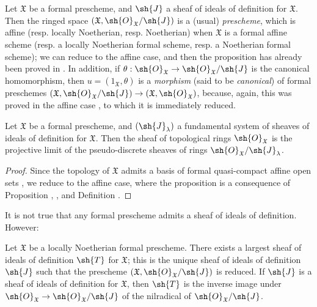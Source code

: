 \begin{env}[10.5.2]
\label{I.10.5.2}
Let $\mathfrak{X}$ be a formal prescheme, and $\sh{J}$ a sheaf of ideals of definition for $\mathfrak{X}$.
Then the ringed space $(\mathfrak{X},\sh{O}_\mathfrak{X}/\sh{J})$ is a (usual) \emph{prescheme}, which is affine (resp. locally Noetherian, resp. Noetherian) when $\mathfrak{X}$ is a formal affine scheme (resp. a locally Noetherian formal scheme, resp. a Noetherian formal scheme);  we can reduce to the affine case, and then the proposition has already been proved in .
In addition, if $\theta:\sh{O}_\mathfrak{X}\to\sh{O}_\mathfrak{X}/\sh{J}$ is the canonical homomorphism, then $u=(1_\mathfrak{X},\theta)$ is a \emph{morphism} (said to be \emph{canonical}) of formal preschemes $(\mathfrak{X},\sh{O}_\mathfrak{X}/\sh{J})\to(\mathfrak{X},\sh{O}_\mathfrak{X})$, because, again, this was proved in the affine case , to which it is immediately reduced.
\end{env}

\begin{proposition}[10.5.3]
\label{I.10.5.3}
Let $\mathfrak{X}$ be a formal prescheme, and $(\sh{J}_\lambda)$ a fundamental system of sheaves of ideals of definition for $\mathfrak{X}$.
Then the sheaf of topological rings $\sh{O}_\mathfrak{X}$ is the projective limit of the pseudo-discrete sheaves of rings  $\sh{O}_\mathfrak{X}/\sh{J}_\lambda$.
\end{proposition}

\begin{proof}
Since the topology of $\mathfrak{X}$ admits a basis of formal quasi-compact affine open sets , we reduce to the affine case, where the proposition is a consequence of Proposition , , and Definition .
\end{proof}

It is not true that any formal prescheme admits a sheaf of ideals of definition.
However:
\begin{proposition}[10.5.4]
\label{I.10.5.4}
Let $\mathfrak{X}$ be a locally Noetherian formal prescheme.
There exists a largest sheaf of ideals of definition $\sh{T}$ for $\mathfrak{X}$; this is the unique sheaf of ideals of definition $\sh{J}$ such that the prescheme $(\mathfrak{X},\sh{O}_\mathfrak{X}/\sh{J})$ is reduced.
If $\sh{J}$ is a sheaf of ideals of definition for $\mathfrak{X}$, then $\sh{T}$ is the inverse image under $\sh{O}_\mathfrak{X}\to\sh{O}_\mathfrak{X}/\sh{J}$ of the nilradical of $\sh{O}_\mathfrak{X}/\sh{J}$.
\end{proposition}

